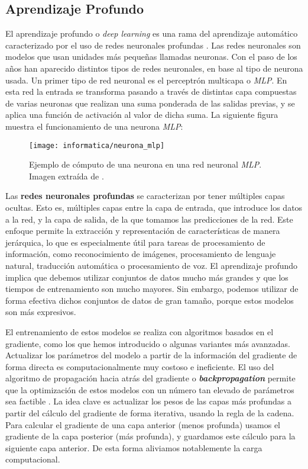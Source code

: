 \subsection{Aprendizaje Profundo} \label{isubs:deep_learning_teoria}

El aprendizaje profundo o \textit{deep learning} es una rama del aprendizaje automático caracterizado por el uso de redes neuronales profundas \cite{informatica:paper_deep_learning_def} \cite{informatica:paper_deep_learning_def_second}. Las redes neuronales son modelos que usan unidades más pequeñas llamadas neuronas. Con el paso de los años han aparecido distintos tipos de redes neuronales, en base al tipo de neurona usada. Un primer tipo de red neuronal es el perceptrón multicapa o \textit{MLP}. En esta red la entrada se transforma pasando a través de distintas capa compuestas de varias neuronas que realizan una suma ponderada de las salidas previas, y se aplica una función de activación al valor de dicha suma. La siguiente figura muestra el funcionamiento de una neurona \textit{MLP}:

\begin{figure}[H]
    \centering
    \texttt{[image: informatica/neurona\_mlp]}
    \caption{Ejemplo de cómputo de una neurona en una red neuronal \textit{MLP}. Imagen extraída de \cite{informatica:paper_deep_learning_def}.}
\end{figure}

Las \textbf{redes neuronales profundas} se caracterizan por tener múltiples capas ocultas. Esto es, múltiples capas entre la capa de entrada, que introduce los datos a la red, y la capa de salida, de la que tomamos las predicciones de la red. Este enfoque permite la extracción y representación de características de manera jerárquica, lo que es especialmente útil para tareas de procesamiento de información, como reconocimiento de imágenes, procesamiento de lenguaje natural, traducción automática o procesamiento de voz. El aprendizaje profundo implica que debemos utilizar conjuntos de datos mucho más grandes y que los tiempos de entrenamiento son mucho mayores. Sin embargo, podemos utilizar de forma efectiva dichos conjuntos de datos de gran tamaño, porque estos modelos son más expresivos.

El entrenamiento de estos modelos se realiza con algoritmos basados en el gradiente, como los que hemos introducido o algunas variantes más avanzadas. Actualizar los parámetros del modelo a partir de la información del gradiente de forma directa es computacionalmente muy costoso e ineficiente. El uso del algoritmo de propagación hacia atrás del gradiente o \textbf{\textit{backpropagation}} permite que la optimización de estos modelos con un número tan elevado de parámetros sea factible \cite{informatica:libro_backprop}. La idea clave es actualizar los pesos de las capas más profundas a partir del cálculo del gradiente de forma iterativa, usando la regla de la cadena. Para calcular el gradiente de una capa anterior (menos profunda) usamos el gradiente de la capa posterior (más profunda), y guardamos este cálculo para la siguiente capa anterior. De esta forma aliviamos notablemente la carga computacional.

